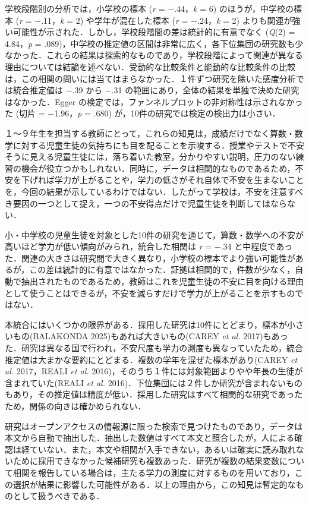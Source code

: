 \documentclass[
  lualatex, ja=standard, paper={182mm,257mm}, twocolumn, fontsize=8.5pt, baselineskip=13.5pt,
  line_length=24zw, column_gap=6.1mm, number_of_lines=45, head_space=24.5mm, gutter=16.25mm
]{jlreq}
\newcommand{\chap}[2]{\par\vspace{13.5pt}\needspace{4\baselineskip}{\centering\gtfamily\bfseries #1．#2\par}\nopagebreak}
\begin{document}
学校段階別の分析では，小学校の標本 (\textit{r} = \ensuremath{-}.44，\textit{k} = 6) のほうが，中学校の標本 (\textit{r} = \ensuremath{-}.11，\textit{k} = 2) や学年が混在した標本 (\textit{r} = \ensuremath{-}.24，\textit{k} = 2) よりも関連が強い可能性が示された．しかし，学校段階間の差は統計的に有意でなく (\textit{Q}(2) = 4.84，\textit{p} = .089)，中学校の推定値の区間は非常に広く，各下位集団の研究数も少なかった．これらの結果は探索的なものであり，学校段階によって関連が異なる理由については結論を述べない．受動的な比較条件と能動的な比較条件の比較は，この相関の問いには当てはまらなかった．１件ずつ研究を除いた感度分析では統合推定値は \ensuremath{-}.39 から \ensuremath{-}.31 の範囲にあり，全体の結果を単独で決めた研究はなかった．Egger の検定では，ファンネルプロットの非対称性は示されなかった (切片 = \ensuremath{-}1.96，\textit{p} = .680) が，10件の研究では検定の検出力は小さい．

１〜９年生を担当する教師にとって，これらの知見は，成績だけでなく算数・数学に対する児童生徒の気持ちにも目を配ることを示唆する．授業やテストで不安そうに見える児童生徒には，落ち着いた教室，分かりやすい説明，圧力のない練習の機会が役立つかもしれない．同時に，データは相関的なものであるため，不安を下げれば学力が上がることや，学力の低さがそれ自体で不安を生まないことを，今回の結果が示しているわけではない．したがって学校は，不安を注意すべき要因の一つとして捉え，一つの不安得点だけで児童生徒を判断してはならない．

\chap{5}{まとめ}
小・中学校の児童生徒を対象とした10件の研究を通じて，算数・数学への不安が高いほど学力が低い傾向がみられ，統合した相関は \textit{r} = \ensuremath{-}.34 と中程度であった．関連の大きさは研究間で大きく異なり，小学校の標本でより強い可能性があるが，この差は統計的に有意ではなかった．証拠は相関的で，件数が少なく，自動で抽出されたものであるため，教師はこれを児童生徒の不安に目を向ける理由として使うことはできるが，不安を減らすだけで学力が上がることを示すものではない．

本統合にはいくつかの限界がある．採用した研究は10件にとどまり，標本が小さいもの(BALAKONDA 2025)もあれば大きいもの(CAREY \textit{et al.} 2017)もあった．研究は異なる国で行われ，不安尺度も学力の測度も異なっていたため，統合推定値は大まかな要約にとどまる．複数の学年を混ぜた標本があり(CAREY \textit{et al.} 2017，REALI \textit{et al.} 2016)，そのうち１件には対象範囲よりやや年長の生徒が含まれていた(REALI \textit{et al.} 2016)．下位集団には２件しか研究が含まれないものもあり，その推定値は精度が低い．採用した研究はすべて相関的な研究であったため，関係の向きは確かめられない．

研究はオープンアクセスの情報源に限った検索で見つけたものであり，データは本文から自動で抽出した．抽出した数値はすべて本文と照合したが，人による確認は経ていない．また，本文や相関が入手できない，あるいは確実に読み取れないために採用できなかった候補研究も複数あった．研究が複数の結果変数について相関を報告している場合は，主たる学力の測度に対するものを用いており，この選択が結果に影響した可能性がある．以上の理由から，この知見は暫定的なものとして扱うべきである．
\end{document}
